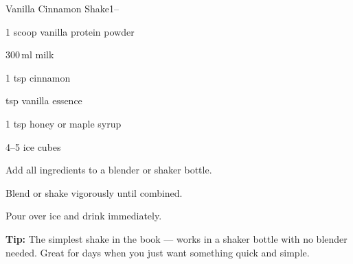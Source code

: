 \begin{recipebox}{Vanilla Cinnamon Shake}{1}{--}
\begin{ingredients}
  \item 1 scoop vanilla protein powder
  \item 300\,ml milk
  \item 1 tsp cinnamon
  \item \textonehalf{} tsp vanilla essence
  \item 1 tsp honey or maple syrup
  \item 4--5 ice cubes
\end{ingredients}

\begin{method}
  \item Add all ingredients to a blender or shaker bottle.
  \item Blend or shake vigorously until combined.
  \item Pour over ice and drink immediately.
\end{method}

\begin{notelist}
  \item \textbf{Tip:} The simplest shake in the book --- works in a shaker bottle with no blender needed. Great for days when you just want something quick and simple.
\end{notelist}
\end{recipebox}
